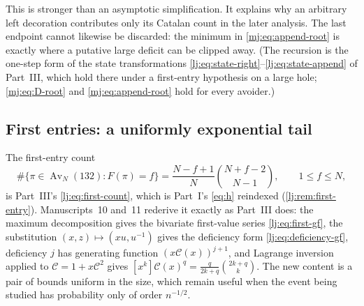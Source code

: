\documentclass[11pt,a4paper]{article}
\theoremstyle{definition}\newaliascnt{definition}{theorem}
\theoremstyle{remark}\newaliascnt{remark}{theorem}
\newcommand{\Av}{\operatorname{Av}}
\newcommand{\Cat}{\mathcal C}
\begin{document}
This is stronger than an asymptotic simplification. It explains why an
arbitrary left decoration contributes only its Catalan count in the later
analysis. The last endpoint cannot likewise be discarded: the minimum in
\eqref{mj:eq:append-root} is exactly where a putative large deficit can be
clipped away. (The recursion is the one-step form of the state
transformations \eqref{lj:eq:state-right}--\eqref{lj:eq:state-append} of
Part~III, which hold there under a first-entry hypothesis on a large hole;
\eqref{mj:eq:D-root} and \eqref{mj:eq:append-root} hold for every avoider.)

\subsection{First entries: a uniformly exponential tail}
\label{mj:sec:first}
The first-entry count
\begin{equation}
 \#\{\pi\in\Av_N(132):F(\pi)=f\}=\frac{N-f+1}{N}\binom{N+f-2}{N-1},
 \qquad1\le f\le N,
 \label{mj:eq:first-count}
\end{equation}
is Part~III's \eqref{lj:eq:first-count}, which is Part~I's \eqref{eq:h}
reindexed (\cref{lj:rem:first-entry}). Manuscripts~10 and~11 rederive it
exactly as Part~III does: the maximum decomposition gives the bivariate
first-value series \eqref{lj:eq:first-gf}, the substitution
$(x,z)\mapsto(xu,u^{-1})$ gives the deficiency form
\eqref{lj:eq:deficiency-gf}, deficiency $j$ has generating function
$(x\Cat(x))^{j+1}$, and Lagrange inversion applied to $\Cat=1+x\Cat^2$
gives $[x^k]\Cat(x)^q=\frac{q}{2k+q}\binom{2k+q}{k}$. The new content is a
pair of bounds uniform in the size, which remain useful when the event
being studied has probability only of order $n^{-1/2}$.
\end{document}

